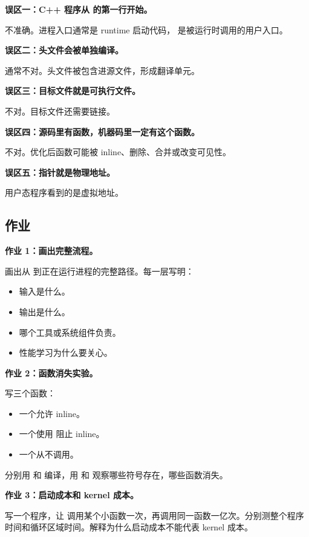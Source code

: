 \begin{warningbox}
\textbf{误区一：C++ 程序从  的第一行开始。}

不准确。进程入口通常是 runtime 启动代码， 是被运行时调用的用户入口。

\textbf{误区二：头文件会被单独编译。}

通常不对。头文件被包含进源文件，形成翻译单元。

\textbf{误区三：目标文件就是可执行文件。}

不对。目标文件还需要链接。

\textbf{误区四：源码里有函数，机器码里一定有这个函数。}

不对。优化后函数可能被 inline、删除、合并或改变可见性。

\textbf{误区五：指针就是物理地址。}

用户态程序看到的是虚拟地址。
\end{warningbox}

\subsection{作业}

\begin{exercisebox}
\textbf{作业 1：画出完整流程。}

画出从  到正在运行进程的完整路径。每一层写明：

\begin{itemize}
  \item 输入是什么。
  \item 输出是什么。
  \item 哪个工具或系统组件负责。
  \item 性能学习为什么要关心。
\end{itemize}

\textbf{作业 2：函数消失实验。}

写三个函数：

\begin{itemize}
  \item 一个允许 inline。
  \item 一个使用  阻止 inline。
  \item 一个从不调用。
\end{itemize}

分别用  和  编译，用  和  观察哪些符号存在，哪些函数消失。

\textbf{作业 3：启动成本和 kernel 成本。}

写一个程序，让  调用某个小函数一次，再调用同一函数一亿次。分别测整个程序时间和循环区域时间。解释为什么启动成本不能代表 kernel 成本。
\end{exercisebox}

